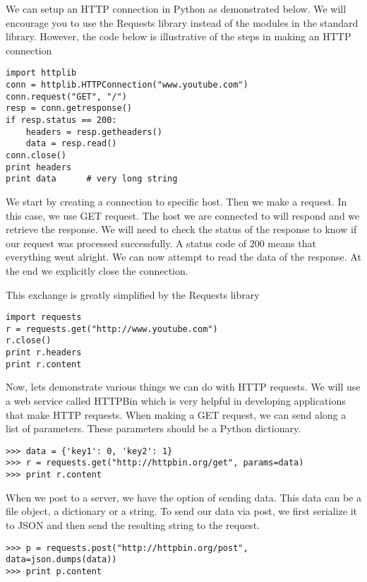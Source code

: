 We can setup an HTTP connection in Python as demonstrated below.
We will encourage you to use the Requests library instead of the modules in the standard library.
However, the code below is illustrative of the steps in making an HTTP connection
\begin{lstlisting}
import httplib
conn = httplib.HTTPConnection("www.youtube.com")
conn.request("GET", "/")
resp = conn.getresponse()
if resp.status == 200:
    headers = resp.getheaders()
    data = resp.read()
conn.close()
print headers
print data      # very long string
\end{lstlisting}
We start by creating a connection to specific host.
Then we make a request.  In this case, we use GET request.
The host we are connected to will respond and we retrieve the response. 
We will need to check the status of the response to know if our request was processed successfully.
A status code of $200$ means that everything went alright.
We can now attempt to read the data of the response.
At the end we explicitly close the connection.

This exchange is greatly simplified by the Requests library
\begin{lstlisting}
import requests
r = requests.get("http://www.youtube.com")
r.close()
print r.headers
print r.content
\end{lstlisting}

Now, lets demonstrate various things we can do with HTTP requests.
We will use a web service called HTTPBin which is very helpful in developing applications that make HTTP requests.
When making a GET request, we can send along a list of parameters.
These parameters should be a Python dictionary.
\begin{lstlisting}
>>> data = {'key1': 0, 'key2': 1}
>>> r = requests.get("http://httpbin.org/get", params=data)
>>> print r.content
\end{lstlisting}

When we post to a server, we have the option of sending data.
This data can be a file object, a dictionary or a string.
To send our data via post, we first serialize it to JSON and then send the resulting string to the request.
\begin{lstlisting}
>>> p = requests.post("http://httpbin.org/post", data=json.dumps(data))
>>> print p.content
\end{lstlisting}

